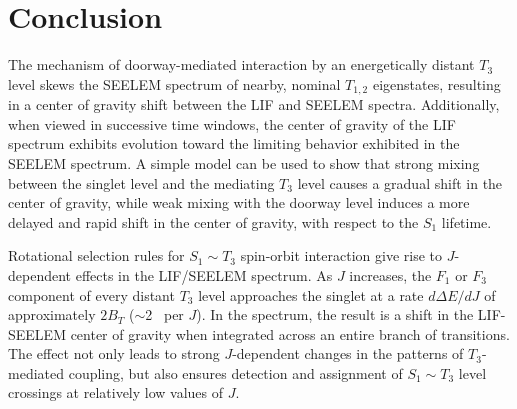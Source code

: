 





























\section{Conclusion}

The mechanism of doorway-mediated interaction by an energetically
distant $T_3$ level skews the SEELEM spectrum of nearby, nominal $T_{1,2}$
eigenstates, resulting in a center of gravity shift between the LIF
and SEELEM spectra.  Additionally, when viewed in successive time
windows, the center of gravity of the LIF spectrum exhibits evolution
toward the limiting behavior exhibited in the SEELEM spectrum.  A
simple model can be used to show that strong mixing between the
singlet level and the mediating $T_3$ level causes a gradual shift in
the center of gravity, while weak mixing with the doorway level
induces a more delayed and rapid shift in the center of gravity, with
respect to the $S_1$ lifetime.

Rotational selection rules for $S_1 \sim T_3$ spin-orbit interaction
give rise to $J$-dependent effects in the LIF/SEELEM spectrum.  As $J$
increases, the $F_1$ or $F_3$ component of every distant $T_3$ level
approaches the singlet at a rate $d\Delta E / dJ$ of approximately
$2B_T$ ($\sim$2 \rcm\ per $J$).  In the spectrum, the result is a
shift in the LIF-SEELEM center of gravity when integrated across an
entire branch of transitions.  The effect not only leads to strong
$J$-dependent changes in the patterns of $T_3$-mediated coupling, but
also ensures detection and assignment of $S_1 \sim T_3$ level
crossings at relatively low values of $J$.


